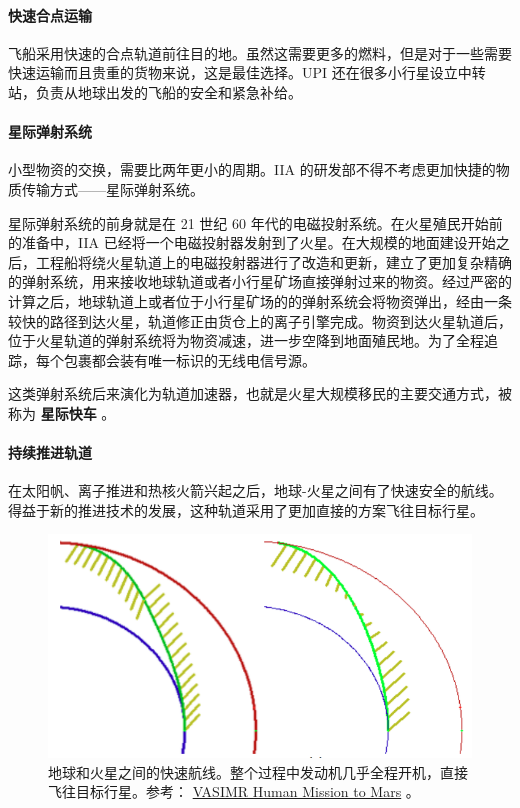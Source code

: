 \documentclass[letterpaper,10pt]{sphinxmanual}
\begin{document}
\paragraph{快速合点运输}
\label{tech:id9}
飞船采用快速的合点轨道前往目的地。虽然这需要更多的燃料，但是对于一些需要快速运输而且贵重的货物来说，这是最佳选择。UPI 还在很多小行星设立中转站，负责从地球出发的飞船的安全和紧急补给。


\paragraph{星际弹射系统}
\label{tech:index-4}\label{tech:id10}
小型物资的交换，需要比两年更小的周期。IIA 的研发部不得不考虑更加快捷的物质传输方式——星际弹射系统。

星际弹射系统的前身就是在 21 世纪 60 年代的电磁投射系统。在火星殖民开始前的准备中，IIA 已经将一个电磁投射器发射到了火星。在大规模的地面建设开始之后，工程船将绕火星轨道上的电磁投射器进行了改造和更新，建立了更加复杂精确的弹射系统，用来接收地球轨道或者小行星矿场直接弹射过来的物资。经过严密的计算之后，地球轨道上或者位于小行星矿场的的弹射系统会将物资弹出，经由一条较快的路径到达火星，轨道修正由货仓上的离子引擎完成。物资到达火星轨道后，位于火星轨道的弹射系统将为物资减速，进一步空降到地面殖民地。为了全程追踪，每个包裹都会装有唯一标识的无线电信号源。

这类弹射系统后来演化为轨道加速器，也就是火星大规模移民的主要交通方式，被称为 \textbf{星际快车} 。


\paragraph{持续推进轨道}
\label{tech:id11}
在太阳帆、离子推进和热核火箭兴起之后，地球-火星之间有了快速安全的航线。得益于新的推进技术的发展，这种轨道采用了更加直接的方案飞往目标行星。
\begin{figure}[htbp]
\centering
\capstart

\includegraphics{ionThrustTrajectory.png}
\caption{地球和火星之间的快速航线。整个过程中发动机几乎全程开机，直接飞往目标行星。参考： \href{http://www.adastrarocket.com/Andrew-SPESIF-2011.pdf}{VASIMR Human Mission to Mars} 。}\end{figure}
\end{document}
